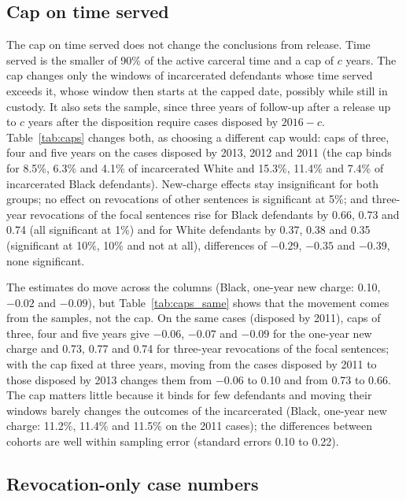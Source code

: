 \documentclass[11pt]{article}
\begin{document}
\subsection{Cap on time served}\label{sec:caps}

The cap on time served does not change the conclusions from release. Time served is the smaller of 90\% of the active carceral time and a cap of $c$ years. The cap changes only the windows of incarcerated defendants whose time served exceeds it, whose window then starts at the capped date, possibly while still in custody. It also sets the sample, since three years of follow-up after a release up to $c$ years after the disposition require cases disposed by $2016 - c$. Table~\ref{tab:caps} changes both, as choosing a different cap would: caps of three, four and five years on the cases disposed by 2013, 2012 and 2011 (the cap binds for 8.5\%, 6.3\% and 4.1\% of incarcerated White and 15.3\%, 11.4\% and 7.4\% of incarcerated Black defendants). New-charge effects stay insignificant for both groups; no effect on revocations of other sentences is significant at 5\%; and three-year revocations of the focal sentences rise for Black defendants by 0.66, 0.73 and 0.74 (all significant at 1\%) and for White defendants by 0.37, 0.38 and 0.35 (significant at 10\%, 10\% and not at all), differences of $-0.29$, $-0.35$ and $-0.39$, none significant.

The estimates do move across the columns (Black, one-year new charge: 0.10, $-0.02$ and $-0.09$), but Table~\ref{tab:caps_same} shows that the movement comes from the samples, not the cap. On the same cases (disposed by 2011), caps of three, four and five years give $-0.06$, $-0.07$ and $-0.09$ for the one-year new charge and 0.73, 0.77 and 0.74 for three-year revocations of the focal sentences; with the cap fixed at three years, moving from the cases disposed by 2011 to those disposed by 2013 changes them from $-0.06$ to 0.10 and from 0.73 to 0.66. The cap matters little because it binds for few defendants and moving their windows barely changes the outcomes of the incarcerated (Black, one-year new charge: 11.2\%, 11.4\% and 11.5\% on the 2011 cases); the differences between cohorts are well within sampling error (standard errors 0.10 to 0.22).

\subsection{Revocation-only case numbers}\label{sec:revonly}
\end{document}
